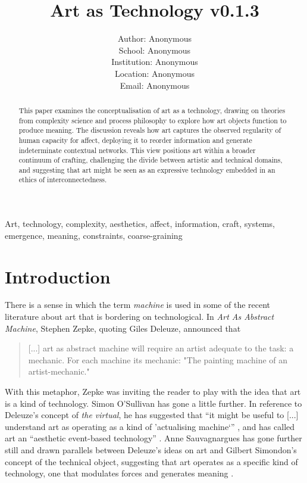 \documentclass[letterpaper]{article}
\title{Art as Technology v0.1.3}
\author{Author: Anonymous\\
School: Anonymous\\
Institution: Anonymous\\
Location: Anonymous\\
Email: Anonymous\\
\newline
\newline
}
\begin{document}
 
\maketitle
\begin{abstract}

This paper examines the conceptualisation of art as a technology, drawing on theories from complexity science and process philosophy to explore how art objects function to produce meaning. The discussion reveals how art captures the observed regularity of human capacity for affect, deploying it to reorder information and generate indeterminate contextual networks. This view positions art within a broader continuum of crafting, challenging the divide between artistic and technical domains, and suggesting that art might be seen as an expressive technology embedded in an ethics of interconnectedness.
\end{abstract}


Art, technology, complexity, aesthetics, affect, information, craft, systems, emergence, meaning, constraints, coarse-graining

\section{Introduction}

    There is a sense in which the term \emph{machine} is used in some of the recent literature about art that is bordering on technological. In \emph{Art As Abstract Machine}, Stephen Zepke, quoting Giles Deleuze, announced that 

    \begin{quote}
        [...] art as abstract machine will require an artist adequate to the task: a mechanic. For each machine its mechanic: "The painting machine of an artist-mechanic." \citep[p.1]{ZepkeArtAsAbstrctMchn2005}
    \end{quote}

    With this metaphor, Zepke was inviting the reader to play with the idea that art is a kind of technology. Simon O'Sullivan has gone a little further. In reference to Deleuze's concept of \emph{the virtual}, he has suggested that “it might be useful to [...] understand art as operating as a kind of ’actualising machine‘” \citep[p.200]{ZepkeOSullivanDlzCntmprryArt2010}, and has called art an “aesthetic event-based technology” \citep[p.202]{ZepkeOSullivanDlzCntmprryArt2010}. Anne Sauvagnargues has gone further still and drawn parallels between Deleuze’s ideas on art and Gilbert Simondon’s concept of the technical object, suggesting that art operates as a specific kind of technology, one that modulates forces and generates meaning \citep[pp.74-75]{SauvagnarguesArtmchns2016}.
\end{document}
